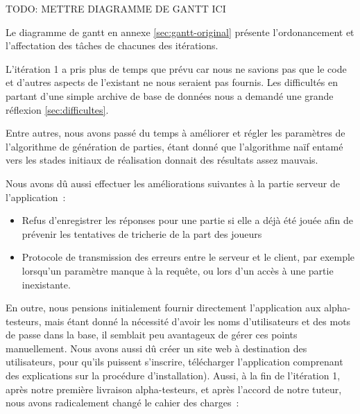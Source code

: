 \documentclass[a4paper,11pt,french]{article}
\begin{document}
TODO: METTRE DIAGRAMME DE GANTT ICI 
 
Le diagramme de gantt en annexe \ref{sec:gantt-original} présente l'ordonancement et l'affectation des tâches de chacunes des itérations.

L'itération 1 a pris plus de temps que prévu car nous ne savions pas que le code et d'autres aspects de l'existant ne nous seraient pas fournis. Les difficultés en partant d'une simple archive de base de données nous a demandé une grande réflexion \ref{sec:difficultes}.

Entre autres, nous avons passé du temps à améliorer et régler les paramètres de l'algorithme de génération de parties, étant donné que l'algorithme naïf entamé vers les stades initiaux de réalisation donnait des résultats assez mauvais.

Nous avons dû aussi effectuer les améliorations suivantes à la partie serveur de l'application~:
\begin{itemize}
\item Refus d'enregistrer les réponses pour une partie si elle a déjà été jouée afin de prévenir les tentatives de tricherie de la part des joueurs
\item Protocole de transmission des erreurs entre le serveur et le client, par exemple lorsqu'un paramètre manque à la requête, ou lors d'un accès à une partie inexistante.
\end{itemize}

En outre, nous pensions initialement fournir directement l'application aux alpha-testeurs, mais étant donné la nécessité d'avoir les noms d'utilisateurs
et des mots de passe dans la base, il semblait peu avantageux de gérer ces points manuellement. Nous avons aussi dû créer un site web à destination
des utilisateurs, pour qu'ils puissent s'inscrire, télécharger l'application comprenant des explications sur la procédure d'installation). Aussi, à la fin de l'itération 1, après notre première livraison alpha-testeurs, et après l'accord de notre tuteur, nous avons radicalement changé le cahier des charges~:
\end{document}

